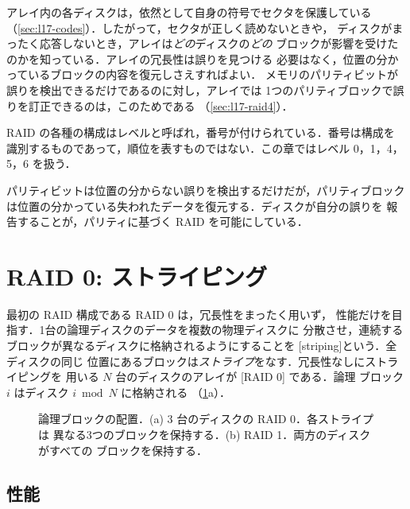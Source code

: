 \documentclass[../main.tex]{subfiles}
\begin{document}
アレイ内の各ディスクは，依然として自身の符号でセクタを保護している
（\cref{sec:l17-codes}）．したがって，セクタが正しく読めないときや，
ディスクがまったく応答しないとき，アレイは\emph{どの}ディスクの\emph{どの}%
ブロックが影響を受けたのかを知っている．アレイの冗長性は誤りを見つける
必要はなく，位置の分かっているブロックの内容を復元しさえすればよい．
メモリのパリティビットが誤りを検出できるだけであるのに対し，アレイでは
1つのパリティブロックで誤りを訂正できるのは，このためである
（\cref{sec:l17-raid4}）．

RAID の各種の構成はレベルと呼ばれ，番号が付けられている．番号は構成を
識別するものであって，順位を表すものではない．この章ではレベル 0，1，4，
5，6 を扱う．

\begin{keypoint}
  パリティビットは位置の分からない誤りを検出するだけだが，パリティブロック
  は位置の分かっている失われたデータを復元する．ディスクが自分の誤りを
  報告することが，パリティに基づく RAID を可能にしている．
\end{keypoint}

\section{RAID 0: ストライピング}
\label{sec:l17-raid0}

最初の RAID 構成である RAID 0 は，冗長性をまったく用いず，
性能だけを目指す．1台の論理ディスクのデータを複数の物理ディスクに
分散させ，連続するブロックが異なるディスクに格納されるようにすることを
[striping]という．全ディスクの同じ
位置にあるブロックは\emph{ストライプ}をなす．冗長性なしにストライピングを
用いる $N$ 台のディスクのアレイが [RAID 0] である．論理
ブロック $i$ はディスク $i \bmod N$ に格納される
（\cref{fig:l17-raid01}a）．

\begin{figure}[htbp]
  \centering
  
  \caption{論理ブロックの配置．(a) 3 台のディスクの RAID 0．各ストライプは
    異なる3つのブロックを保持する．(b) RAID 1．両方のディスクがすべての
    ブロックを保持する．}
  \label{fig:l17-raid01}
\end{figure}

\subsection{性能}
\end{document}
